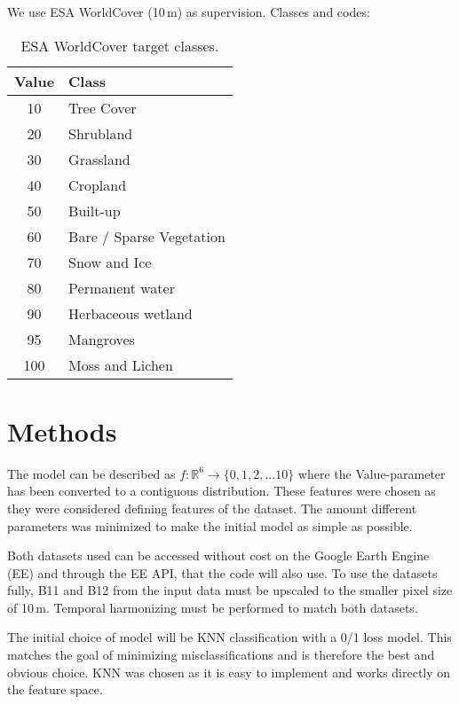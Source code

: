 \documentclass{article}
\begin{document}
We use ESA WorldCover (10\,m) as supervision. Classes and codes:

\begin{table}[h]
    \centering
    \begin{tabular}{|c|l|}\hline
        Value & Class \\\hline
          10 & Tree Cover\\\hline
          20 & Shrubland\\\hline
          30 & Grassland\\\hline
          40 & Cropland\\\hline
          50 & Built-up\\\hline
          60 & Bare / Sparse Vegetation\\\hline
          70 & Snow and Ice\\\hline
          80 & Permanent water\\\hline
          90 & Herbaceous wetland\\\hline
          95 & Mangroves\\\hline
          100 & Moss and Lichen\\\hline
    \end{tabular}
    \caption{ESA WorldCover target classes.}
    \label{tab:worldcover}
\end{table}



\section{Methods}
The model can be described as $f:\mathbb{R}^{6}\rightarrow \{0,1,2,... 10\}$ where the Value-parameter has been converted to a contiguous distribution. These features were chosen as they were considered defining features of the dataset. The amount different parameters was minimized to make the initial model as simple as possible. 

Both datasets used can be accessed without cost on the Google Earth Engine (EE) and through the EE API, that the code will also use. To use the datasets fully, B11 and B12 from the input data must be upscaled to the smaller pixel size of 10\,m. Temporal harmonizing must be performed to match both datasets. 

The initial choice of model will be KNN classification with a 0/1 loss model. This matches the goal of minimizing misclassifications and is therefore the best and obvious choice. KNN was chosen as it is easy to implement and works directly on the feature space.
\end{document}
